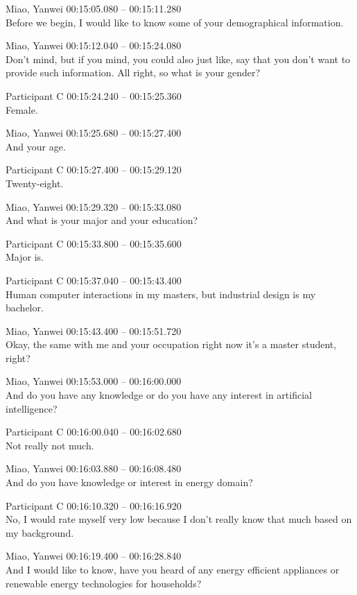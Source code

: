 {\parindent0pt
\tiny
\singlespacing
Miao, Yanwei 00:15:05.080 -- 00:15:11.280 \\
Before we begin, I would like to know some of your demographical information.

Miao, Yanwei 00:15:12.040 -- 00:15:24.080 \\
Don't mind, but if you mind, you could also just like, say that you don't want to provide such information. All right, so what is your gender?

Participant C 00:15:24.240 -- 00:15:25.360 \\
Female.

Miao, Yanwei 00:15:25.680 -- 00:15:27.400 \\
And your age.

Participant C 00:15:27.400 -- 00:15:29.120 \\
Twenty-eight.

Miao, Yanwei 00:15:29.320 -- 00:15:33.080 \\
And what is your major and your education?

Participant C 00:15:33.800 -- 00:15:35.600 \\
Major is.

Participant C 00:15:37.040 -- 00:15:43.400 \\
Human computer interactions in my masters, but industrial design is my bachelor.

Miao, Yanwei 00:15:43.400 -- 00:15:51.720 \\
Okay, the same with me and your occupation right now it's a master student, right?

Miao, Yanwei 00:15:53.000 -- 00:16:00.000 \\
And do you have any knowledge or do you have any interest in artificial intelligence?

Participant C 00:16:00.040 -- 00:16:02.680 \\
Not really not much.

Miao, Yanwei 00:16:03.880 -- 00:16:08.480 \\
And do you have knowledge or interest in energy domain?

Participant C 00:16:10.320 -- 00:16:16.920 \\
No, I would rate myself very low because I don't really know that much based on my background.

Miao, Yanwei 00:16:19.400 -- 00:16:28.840 \\
And I would like to know, have you heard of any energy efficient appliances or renewable energy technologies for households?

}

